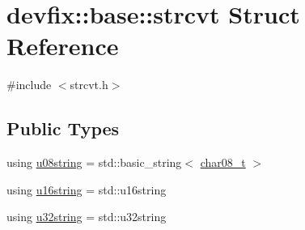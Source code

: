 \hypertarget{structdevfix_1_1base_1_1strcvt}{}\section{devfix\+:\+:base\+:\+:strcvt Struct Reference}
\label{structdevfix_1_1base_1_1strcvt}


{\ttfamily \#include $<$strcvt.\+h$>$}

\subsection*{Public Types}
\begin{DoxyCompactItemize}
\item 
using \hyperlink{structdevfix_1_1base_1_1strcvt_ad2a80b923d1d235cee3d4cd0bc560b64}{u08string} = std\+::basic\+\_\+string$<$ \hyperlink{strcvt_8h_a4af1e597c87b7893007a4ea68d648e91}{char08\+\_\+t} $>$
\item 
using \hyperlink{structdevfix_1_1base_1_1strcvt_a33a324a669607cdb717d84bbfa1f844b}{u16string} = std\+::u16string
\item 
using \hyperlink{structdevfix_1_1base_1_1strcvt_a34f169167c3c7c1315df2eca9d5532d7}{u32string} = std\+::u32string
\end{DoxyCompactItemize}
